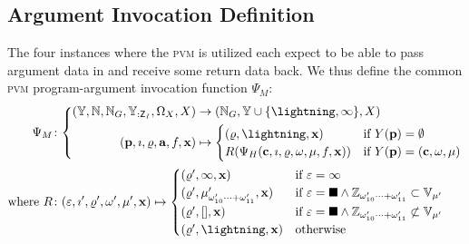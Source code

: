 \subsection{Argument Invocation Definition}

The four instances where the \textsc{pvm} is utilized each expect to be able to pass argument data in and receive some return data back. We thus define the common \textsc{pvm} program-argument invocation function $\Psi_M$:
\begin{align}
  \Psi_M&\colon \left\{\begin{aligned}
    (\Y, \N, \N_G, \Y_{:\mathsf{Z}_I}, \Omega_X, X) &\to (\N_G, \Y \cup \{\panic, \oog\}, X)\\
    (\mathbf{p}, \imath, \gascounter, \mathbf{a}, f, \mathbf{x}) &\mapsto \begin{cases}
      (\gascounter, \panic, \mathbf{x}) &\when Y(\mathbf{p}) = \none\\
      R(\Psi_H(\mathbf{c}, \imath, \gascounter, \registers, \mem, f, \mathbf{x})) &\when Y(\mathbf{p}) = (\mathbf{c}, \registers, \mem)
    \end{cases}
  \end{aligned}\right.\\
  \where R&\colon (\varepsilon, \imath', \gascounter', \registers', \mem', \mathbf{x}) \mapsto \begin{cases}
    (\gascounter', \oog, \mathbf{x}) &\when \varepsilon = \oog \\
    (\gascounter', \memory'_{\registers'_{10}\dots+\registers'_{11}}, \mathbf{x}) &\when \varepsilon = \halt \wedge \mathbb{Z}_{\registers'_{10}\dots+\registers'_{11}} \subset \mathbb{V}_{\mem'} \\
    (\gascounter', [], \mathbf{x}) &\when \varepsilon = \halt \wedge \mathbb{Z}_{\registers'_{10}\dots+\registers'_{11}} \not\subset \mathbb{V}_{\mem'} \\
    (\gascounter', \panic, \mathbf{x}) &\otherwise \\
  \end{cases}
\end{align}
